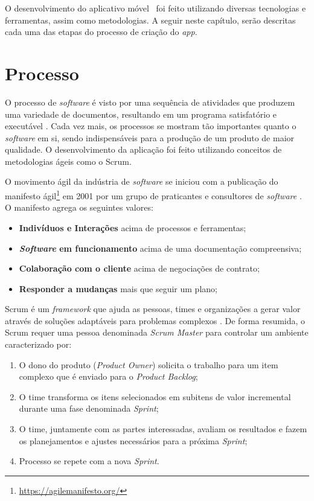 O desenvolvimento do aplicativo móvel \appName\ foi feito utilizando diversas tecnologias e ferramentas, assim como metodologias. A seguir neste capítulo, serão descritas cada uma das etapas do processo de criação do \textit{app}.

\section{Processo}

O processo de \textit{software} é visto por uma sequência de atividades
que produzem uma variedade de documentos, resultando em um programa
satisfatório e executável \cite{processos_software}. Cada vez mais, os processos se mostram tão importantes quanto o \textit{software} em si, sendo indispensáveis para a produção de um produto de maior qualidade. O desenvolvimento da aplicação foi feito utilizando conceitos de metodologias ágeis como o Scrum.

O movimento ágil da indústria de \textit{software} se iniciou com a publicação do manifesto ágil\footnote{\url{https://agilemanifesto.org/}} em 2001 por um grupo de praticantes e consultores de \textit{software} \cite{agile_software_development}. O manifesto agrega os seguintes valores:

\begin{itemize}
    \item \textbf{Indivíduos e Interações} acima de processos e ferramentas;
    \item \textbf{\textit{Software} em funcionamento} acima de uma documentação compreensiva;
    \item \textbf{Colaboração com o cliente} acima de negociações de contrato;
    \item \textbf{Responder a mudanças} mais que seguir um plano;
\end{itemize}

Scrum é um \textit{framework} que ajuda as pessoas, times e organizações a gerar valor através de soluções adaptáveis para problemas complexos \cite{scrum_guide}. De forma resumida, o Scrum requer uma pessoa denominada \textit{Scrum Master} para controlar um ambiente caracterizado por:

\begin{enumerate}
    \item O dono do produto (\textit{Product Owner}) solicita o trabalho para um item complexo que é enviado para o \textit{Product Backlog};
    \item O time transforma os itens selecionados em subitens de valor incremental durante uma fase denominada \textit{Sprint};
    \item O time, juntamente com as partes interessadas, avaliam os resultados e fazem os planejamentos e ajustes necessários para a próxima \textit{Sprint};
    \item Processo se repete com a nova \textit{Sprint}.
\end{enumerate}

